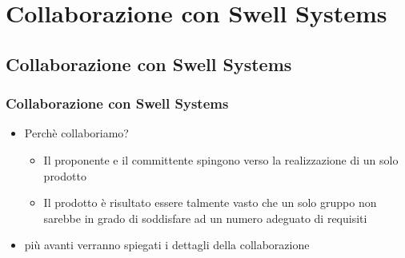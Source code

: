 
\section{Collaborazione con Swell Systems}

\subsection*{Collaborazione con Swell Systems}

\begin{frame}
\frametitle{Collaborazione con Swell Systems}

\begin{itemize}
\item \alert{Perchè collaboriamo?}
\begin{itemize}
\item Il proponente e il committente spingono verso la realizzazione di un \alert{solo} prodotto
\item Il prodotto è risultato essere talmente vasto che un solo gruppo non sarebbe in grado 
di soddisfare ad un numero adeguato di requisiti
\end{itemize}
\item più avanti verranno spiegati i dettagli della collaborazione
\end{itemize}

\end{frame}

